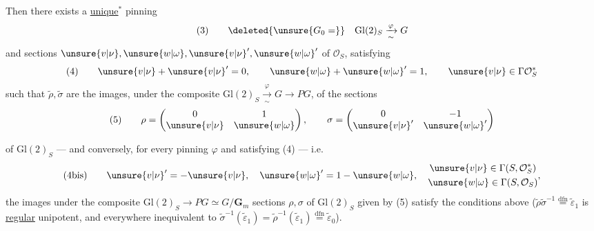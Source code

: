 Then there exists a \uline{unique}$^*$ pinning
\[
(3)\qquad\deleted{\unsure{G_0=}}\quad\mathrm{Gl}(2)_S\xrightarrow[\sim]{\varphi}G
\]
and sections $\unsure{v|\nu},\unsure{w|\omega},\unsure{v|\nu}',\unsure{w|\omega}'$ of $\mathcal O_S$, satisfying
\[
(4)\qquad \unsure{v|\nu}+\unsure{v|\nu}'=0,\qquad \unsure{w|\omega}+\unsure{w|\omega}'=1,\qquad \unsure{v|\nu}\in\Gamma\mathcal O_S^*
\]
such that $\widetilde\rho,\widetilde\sigma$ are the images, under the composite $\mathrm{Gl}(2)_S\xrightarrow[\sim]{\varphi}G\longrightarrow PG$, of the sections
\[
(5)\qquad \rho=\begin{pmatrix}0&1\\\unsure{v|\nu}&\unsure{w|\omega}\end{pmatrix},\qquad
\sigma=\begin{pmatrix}0&-1\\\unsure{v|\nu}'&\unsure{w|\omega}'\end{pmatrix}
\]

of $\mathrm{Gl}(2)_S$ --- and conversely, for every pinning $\varphi$ and   satisfying (4) --- i.e.
\[
(4\mathrm{bis})\qquad \unsure{v|\nu}'=-\unsure{v|\nu},\quad \unsure{w|\omega}'=1-\unsure{w|\omega},\quad\begin{gathered}\unsure{v|\nu}\in\Gamma(S,\mathcal O_S^*)\\\unsure{w|\omega}\in\Gamma(S,\mathcal O_S)\end{gathered},
\]
the images \inserted{$\widetilde\rho,\widetilde\sigma$} under the composite $\mathrm{Gl}(2)_S\longrightarrow PG\simeq G/\mathbf G_m$  sections $\rho,\sigma$ of $\mathrm{Gl}(2)_S$ given by (5) satisfy the conditions above ($\widetilde\rho\widetilde\sigma^{-1}\overset{\mathrm{dfn}}=\widetilde\varepsilon_1$ is \uline{regular} unipotent, and everywhere inequivalent to $\widetilde\sigma^{-1}(\widetilde\varepsilon_1)=\widetilde\rho^{-1}(\widetilde\varepsilon_1)\overset{\mathrm{dfn}}=\widetilde\varepsilon_0$).

